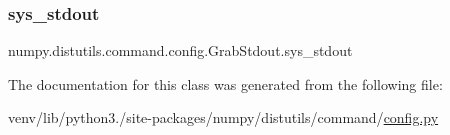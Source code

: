 \subsubsection{\texorpdfstring{sys\+\_\+stdout}{sys\_stdout}}
{\footnotesize\ttfamily numpy.\+distutils.\+command.\+config.\+Grab\+Stdout.\+sys\+\_\+stdout}



The documentation for this class was generated from the following file\+:\begin{DoxyCompactItemize}
\item 
venv/lib/python3./site-\/packages/numpy/distutils/command/\hyperlink{numpy_2distutils_2command_2config_8py}{config.\+py}\end{DoxyCompactItemize}
